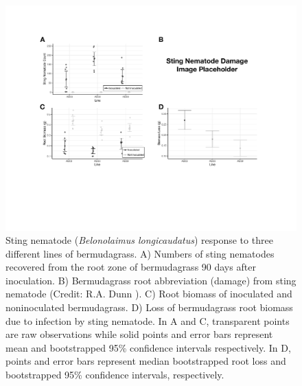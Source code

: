 \documentclass[9pt,lineno]{elife}
\begin{document}
\begin{figure}
\begin{fullwidth}
\includegraphics[width=0.95\linewidth]{figures/publication_figures/figure-1.pdf}
\caption{Sting nematode (\textit{Belonolaimus longicaudatus}) response to three different lines of bermudagrass.  A) Numbers of sting nematodes recovered from the root zone of bermudagrass 90 days after inoculation.  B) Bermudagrass root abbreviation (damage) from sting nematode (Credit: R.A. Dunn \citep{crow2001sting}).  C) Root biomass of inoculated and noninoculated bermudagrass.  D) Loss of bermudagrass root biomass due to infection by sting nematode.  In A and C, transparent points are raw observations while solid points and error bars represent mean and bootstrapped 95\% confidence intervals respectively.  In D, points and error bars represent median bootstrapped root loss and bootstrapped 95\% confidence intervals, respectively.   }
\label{fig:figure1}
\end{fullwidth}
\end{figure}
\end{document}
